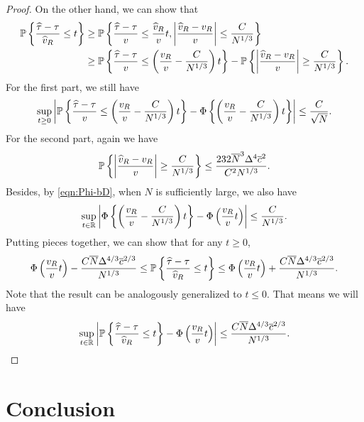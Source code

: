 \documentclass[12pt]{article}
\begin{document}
\begin{proof}
{    On the other hand, we can show that
    \begin{align*}
        {\mathbb{P}}\left\{\frac{{\widehat{\tau}} - \tau}{\widehat{v}_R} \le t\right\} &\ge 
        {\mathbb{P}}\left\{\frac{{\widehat{\tau}} - \tau}{{v}} \le \frac{\widehat{v}_R}{{v}}t, \left|\frac{\widehat{v}_R - v_R}{v}\right| \le \frac{C}{N^{1/3}}\right\} \\
        &\ge {\mathbb{P}}\left\{\frac{{\widehat{\tau}} - \tau}{{v}} \le \left(\frac{{v}_R}{v} - \frac{C}{N^{1/3}}\right)t\right\} - {\mathbb{P}}\left\{ \left|\frac{\widehat{v}_R - v_R}{v}\right| \ge \frac{C}{N^{{1}/{3}}}\right\}.
    \end{align*}
    For the first part,  we still have
    \begin{align*}
        \sup_{t\ge 0}\left|{\mathbb{P}}\left\{\frac{{\widehat{\tau}} - \tau}{{v}}   \le \left(\frac{{v}_R}{v} - \frac{C}{N^{1/3}}\right)t\right\} - \Phi\left\{\left(\frac{{v}_R}{v} - \frac{C}{N^{1/3}}\right)t \right\}\right| \le \frac{C}{\sqrt{N}}.
    \end{align*}
    For the second part, again we have
    \begin{align*}
        {\mathbb{P}}\left\{ \left|\frac{\widehat{v}_R - v_R}{v}\right| \ge \frac{C}{N^{{1}/{3}}}\right\}  \le \frac{232\overline{N}^3\Delta^4\overline{c}^2}{C^2N^{1/3}}.
    \end{align*}
    Besides, by \eqref{eqn:Phi-bD}, when $N$ is sufficiently large, we also have
    \begin{align*}
        \sup_{t\in{\mathbb{R}}}\left|\Phi\left\{\left(\frac{{v}_R}{v} - \frac{C}{N^{1/3}}\right)t \right\} - \Phi\left(\frac{v_R}{v}t\right)\right| \le \frac{C}{N^{1/3}}. 
    \end{align*}
    Putting pieces together, we can show that for any $t\ge 0$,
    \begin{align*}
        \Phi\left(\frac{v_R}{v}t\right) - \frac{C\overline{N}\Delta^{4/3}\overline{c}^{2/3}}{N^{1/3}}\le{\mathbb{P}}\left\{\frac{{\widehat{\tau}} - \tau}{\widehat{v}_R} \le t\right\} \le \Phi\left(\frac{v_R}{v}t\right) + \frac{C\overline{N}\Delta^{4/3}\overline{c}^{2/3}}{N^{1/3}}.
    \end{align*}
    Note that the result can be analogously generalized to $t\le 0$. That means we will have
    \begin{align*}
        \sup_{t\in{\mathbb{R}}}\left|{\mathbb{P}}\left\{\frac{{\widehat{\tau}} - \tau}{\widehat{v}_R} \le t\right\} - \Phi\left(\frac{v_R}{v}t\right)\right| \le \frac{C\overline{N}\Delta^{4/3}\overline{c}^{2/3}}{N^{1/3}}.
    \end{align*}
}

\end{proof}

\section{Conclusion}
\end{document}
